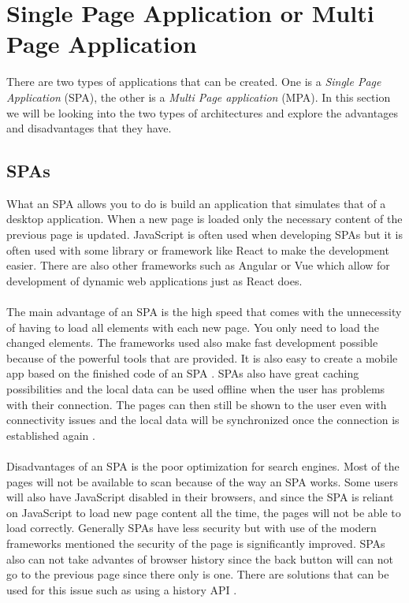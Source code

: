 \section{Single Page Application or Multi Page Application}
There are two types of applications that can be created.
One is a \textit{Single Page Application} (SPA), the other is a \textit{Multi Page application} (MPA).
In this section we will be looking into the two types of architectures and explore the advantages and disadvantages that they have.

\subsection{SPAs}
What an SPA allows you to do is build an application that simulates that of a desktop application. 
When a new page is loaded only the necessary content of the previous page is updated.
JavaScript is often used when developing SPAs but it is often used with some library or framework like React to make the development easier.
There are also other frameworks such as Angular or Vue which allow for development of dynamic web applications just as React does. 
\\\\
The main advantage of an SPA is the high speed that comes with the unnecessity of having to load all elements with each new page.
You only need to load the changed elements. 
The frameworks used also make fast development possible because of the powerful tools that are provided. 
It is also easy to create a mobile app based on the finished code of an SPA \cite{SPAvsMPAMerehead}.
SPAs also have great caching possibilities and the local data can be used offline when the user has problems with their connection. 
The pages can then still be shown to the user even with connectivity issues and the local data will be synchronized once the connection is established again \cite{SPAvsMPARuby}.
\\\\
Disadvantages of an SPA is the poor optimization for search engines. Most of the pages will not be available to scan because of the way an SPA works. 
Some users will also have JavaScript disabled in their browsers, and since the SPA is reliant on JavaScript to load new page content all the time, the pages will not be able to load correctly.
Generally SPAs have less security but with use of the modern frameworks mentioned the security of the page is significantly improved.
SPAs also can not take advantes of browser history since the back button will can not go to the previous page since there only is one. 
There are solutions that can be used for this issue such as using a history API \cite{SPAvsMPAMerehead}.

